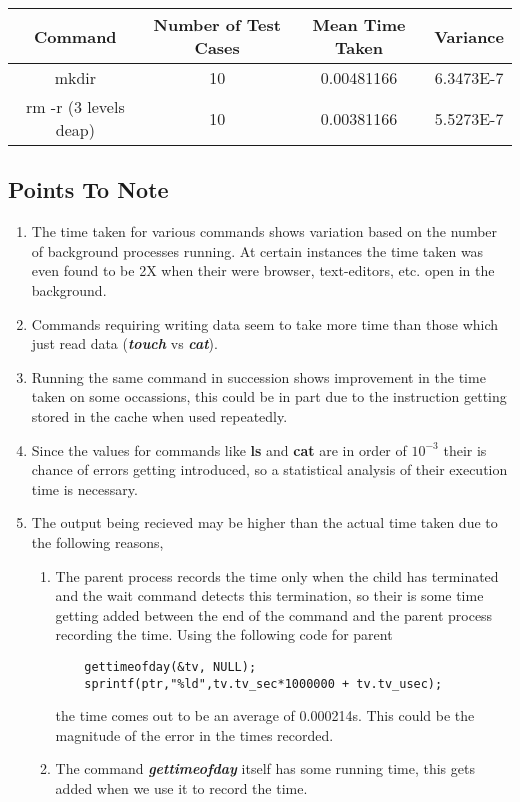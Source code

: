 \documentclass[a4paper,12pt]{report}
\begin{document}
\begin{tabular}{|c|c|c|c|}
\hline
Command               & Number of Test Cases       & Mean Time Taken                    & \multicolumn{1}{l|}{Variance} \\ \hline
mkdir                 & \cellcolor[HTML]{FFFFFF}10 & \cellcolor[HTML]{FFFFFF}0.00481166 & 6.3473E-7                     \\ \hline
rm -r (3 levels deap) & \cellcolor[HTML]{FFFFFF}10 & \cellcolor[HTML]{FFFFFF}0.00381166 & 5.5273E-7                     \\ \hline
\end{tabular}
\subsection*{Points To Note}
\begin{enumerate}
\item The time taken for various commands shows variation based on the number of background processes running. At certain instances the time taken was even found to be 2X when their were browser, text-editors, etc. open in the background.
\item Commands requiring writing data seem to take more time than those which just read data (\textbf{\textit{touch}} vs \textbf{\textit{cat}}).
\item Running the same command in succession shows improvement in the time taken on some occassions, this could be in part due to the instruction getting stored in the cache when used repeatedly.
\item Since the values for commands like \textbf{ls} and \textbf{cat} are in order of $10^{-3}$ their is chance of errors getting introduced, so a statistical analysis of their execution time is necessary.
\item The output being recieved may be higher than the actual time taken due to the following reasons,
\begin{enumerate}
\item The parent process records the time only when the child has terminated and the wait command detects this termination, so their is some time getting added between the end of the command and the parent process recording the time.
Using the following code for parent
\begin{lstlisting}
	gettimeofday(&tv, NULL);							
	sprintf(ptr,"%ld",tv.tv_sec*1000000 + tv.tv_usec);	
\end{lstlisting}
the time comes out to be an average of 0.000214s. This could be the magnitude of the error in the times recorded.
\item The command \textit{\textbf{gettimeofday}} itself has some running time, this gets added when we use it to record the time.
\end{enumerate}
\end{enumerate}
\end{document}
